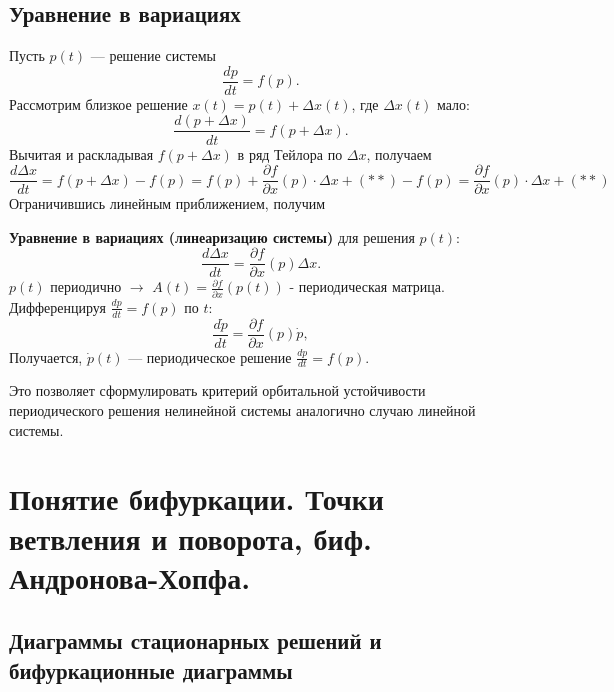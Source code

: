 	\subsection{Уравнение в вариациях}
	
	Пусть \( p(t) \) — решение системы
	\begin{equation}
		\frac{d p}{d t} = f(p).
	\end{equation}
	Рассмотрим близкое решение \( x(t) = p(t) + \Delta x(t) \), где \( \Delta x(t) \) мало:
	\begin{equation}
		\frac{d (p + \Delta x)}{d t} = f(p + \Delta x).
	\end{equation}
	Вычитая и раскладывая \( f(p + \Delta x) \) в ряд Тейлора по \(\Delta x\), получаем
	\begin{equation}
		\frac{d \Delta x}{dt} = f(p + \Delta x) - f(p) = f(p) + \frac{\partial f}{\partial x}(p) \cdot \Delta x + (**) - f(p) = \frac{\partial f}{\partial x}(p) \cdot \Delta x + (**)
	\end{equation}
	Ограничившись линейным приближением, получим 
	\par
	\textbf{Уравнение в вариациях (линеаризацию системы)} для решения \(p(t)\):
	\begin{equation}
		\frac{d \Delta x}{d t} = \frac{\partial f}{\partial x}(p) \Delta x.
	\end{equation}
	\( p(t) \) периодично \(\rightarrow\) \( A(t) = \frac{\partial f}{\partial x}(p(t)) \) - периодическая матрица. Дифференцируя \(\frac{d p}{d t} = f(p)\) по \(t\):
	\begin{equation}
		\frac{d \dot{p}}{d t} = \frac{\partial f}{\partial x}(p) \dot{p},
	\end{equation}
	Получается, \( \dot{p}(t) \) — периодическое решение \(\frac{d p}{d t} = f(p)\).
	\par
	Это позволяет сформулировать критерий орбитальной устойчивости периодического решения нелинейной системы аналогично случаю линейной системы.
	
	\newpage
	
	\section{Понятие бифуркации. Точки ветвления и поворота, биф. Андронова-Хопфа.}
	
	\subsection{Диаграммы стационарных решений и бифуркационные диаграммы}
	
